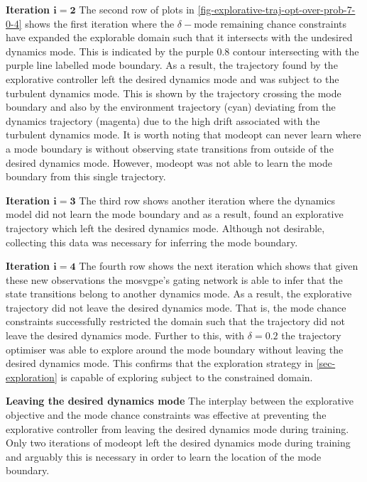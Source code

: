 \documentclass{mimosis-class/mimosis}
\numberwithin{equation}{chapter}
\begin{document}
{\newline

\textbf{Iteration \(\mathbf{i=2}\)}
The second row of plots in
\cref{fig-explorative-traj-opt-over-prob-7-0-4} shows the first iteration
where the \(\delta-\text{mode remaining}\) chance constraints have expanded the explorable domain such that it
intersects with the undesired dynamics mode.
This is indicated by the purple \(0.8\) contour intersecting with the purple line labelled mode boundary.
As a result, the trajectory found by the explorative controller left the desired dynamics mode and was subject to the
turbulent dynamics mode.
This is shown by the trajectory crossing the mode boundary and also by
the environment trajectory (cyan) deviating from the dynamics trajectory (magenta) due to the high drift associated
with the turbulent dynamics mode.
It is worth noting that \acrshort{modeopt} can never learn where a mode boundary is without observing state transitions from
outside of the desired dynamics mode.
However, \acrshort{modeopt} was not able to learn the mode boundary from this single trajectory.

\textbf{Iteration \(\mathbf{i=3}\)}
The third row shows another iteration where the dynamics model did not learn the mode boundary and as a result,
found an explorative trajectory which left the desired dynamics mode.
Although not desirable, collecting this data was necessary for inferring the mode boundary.

\textbf{Iteration \(\mathbf{i=4}\)}
The fourth row shows the next iteration which
shows that given these new observations the \acrshort{mosvgpe}'s gating network is able to infer that the
state transitions belong to another dynamics mode.
As a result, the explorative trajectory did not leave the desired dynamics mode.
That is, the mode chance constraints successfully restricted the domain such that the trajectory did not leave
the desired dynamics mode.
Further to this, with \(\delta=0.2\) the trajectory optimiser was able to explore
around the mode boundary without leaving the desired dynamics mode.
This confirms that the exploration strategy in \cref{sec-exploration} is capable of exploring subject to the
constrained domain.

\textbf{Leaving the desired dynamics mode}
The interplay between the explorative objective and the mode chance constraints was effective at preventing the
explorative controller from leaving the desired dynamics mode during training.
Only two iterations of \acrshort{modeopt} left the desired dynamics mode during training and
arguably this is necessary in order to learn the location of the mode boundary.

}
\end{document}

